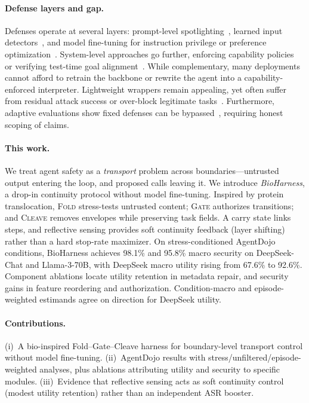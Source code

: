 \paragraph{Defense layers and gap.}
Defenses operate at several layers: prompt-level spotlighting~\citep{hines2024spotlighting}, learned input detectors~\citep{protectai2024pideetector}, and model fine-tuning for instruction privilege or preference optimization~\citep{wallace2024instruction,chen2025struq,chen2025secalign}. System-level approaches go further, enforcing capability policies~\citep{debenedetti2025camel} or verifying test-time goal alignment~\citep{jia2025taskshield}. While complementary, many deployments cannot afford to retrain the backbone or rewrite the agent into a capability-enforced interpreter. Lightweight wrappers remain appealing, yet often suffer from residual attack success or over-block legitimate tasks~\citep{debenedetti2024agentdojo}. Furthermore, adaptive evaluations show fixed defenses can be bypassed~\citep{zhan2025adaptive}, requiring honest scoping of claims.

\paragraph{This work.}
We treat agent safety as a \emph{transport} problem across boundaries---untrusted output entering the loop, and proposed calls leaving it. We introduce \emph{BioHarness}, a drop-in continuity protocol without model fine-tuning. Inspired by protein translocation, \textsc{Fold} stress-tests untrusted content; \textsc{Gate} authorizes transitions; and \textsc{Cleave} removes envelopes while preserving task fields. A carry state links steps, and reflective sensing provides soft continuity feedback (layer shifting) rather than a hard stop-rate maximizer. On stress-conditioned AgentDojo conditions, BioHarness achieves 98.1\% and 95.8\% macro security on DeepSeek-Chat and Llama-3-70B, with DeepSeek macro utility rising from 67.6\% to 92.6\%. Component ablations locate utility retention in metadata repair, and security gains in feature reordering and authorization. Condition-macro and episode-weighted estimands agree on direction for DeepSeek utility.

\paragraph{Contributions.}
(i)~A bio-inspired Fold--Gate--Cleave harness for boundary-level transport control without model fine-tuning.
(ii)~AgentDojo results with stress/unfiltered/episode-weighted analyses, plus ablations attributing utility and security to specific modules.
(iii)~Evidence that reflective sensing acts as soft continuity control (modest utility retention) rather than an independent ASR booster.

